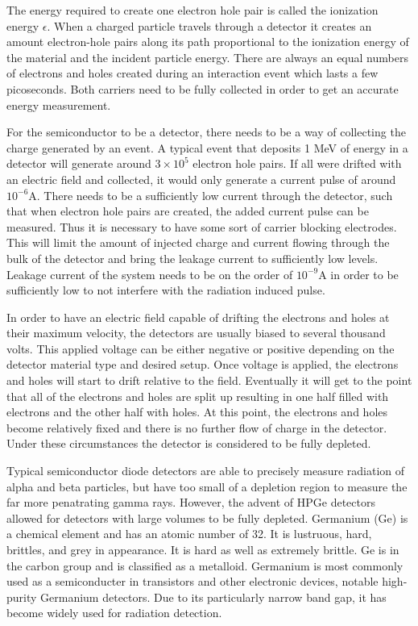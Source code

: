 The energy required to create one electron hole pair is called the ionization energy $\epsilon$.
When a charged particle travels through a detector it creates an amount electron-hole pairs along its path proportional to the ionization energy of the material and the incident particle energy.
There are always an equal numbers of electrons and holes created during an interaction event which lasts a few picoseconds.
Both carriers need to be fully collected in order to get an accurate energy measurement.

For the semiconductor to be a detector, there needs to be a way of collecting the charge generated by an event.
A typical event that deposits 1 MeV of energy in a detector will generate around $3\times 10^{5}$ electron hole pairs.
If all were drifted with an electric field and collected, it would only generate a current pulse of around $10^{-6}$A.
There needs to be a sufficiently low current through the detector, such that when electron hole pairs are created, the added current pulse can be measured.
Thus it is necessary to have some sort of carrier blocking electrodes.
This will limit the amount of injected charge and current flowing through the bulk of the detector and bring the leakage current to sufficiently low levels.
Leakage current of the system needs to be on the order of $10^{-9}$A in order to be sufficiently low to not interfere with the radiation induced pulse.

In order to have an electric field capable of drifting the electrons and holes at their maximum velocity, the detectors are usually biased to several thousand volts.
This applied voltage can be either negative or positive depending on the detector material type and desired setup.
Once voltage is applied, the electrons and holes will start to drift relative to the field.
Eventually it will get to the point that all of the electrons and holes are split up resulting in one half filled with electrons and the other half with holes.
At this point, the electrons and holes become relatively fixed and there is no further flow of charge in the detector.
Under these circumstances the detector is considered to be fully depleted.

Typical semiconductor diode detectors are able to precisely measure radiation of alpha and beta particles, but have too small of a depletion region to measure the far more penatrating gamma rays.
However, the advent of HPGe detectors allowed for detectors with large volumes to be fully depleted.
Germanium (Ge) is a chemical element and has an atomic number of 32.
It is lustruous, hard, brittles, and grey in appearance.
It is hard as well as extremely brittle.
Ge is in the carbon group and is classified as a metalloid.
Germanium is most commonly used as a semiconducter in transistors and other electronic devices, notable high-purity Germanium detectors.
Due to its particularly narrow band gap, it has become widely used for radiation detection. 

